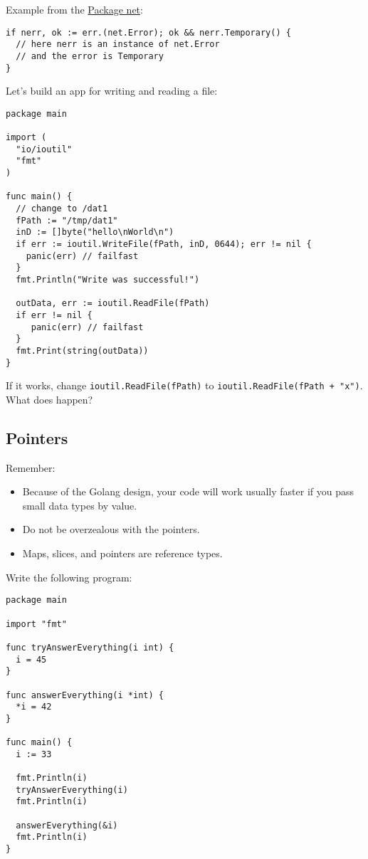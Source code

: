 \documentclass[11pt, letterpaper]{article}
\begin{document}
Example from the \href{https://golang.org/src/net/net.go}{Package net}:

\begin{verbatim}
if nerr, ok := err.(net.Error); ok && nerr.Temporary() {
  // here nerr is an instance of net.Error
  // and the error is Temporary
}
\end{verbatim}

Let's build an app for writing and reading a file:

\begin{verbatim}
package main

import (
  "io/ioutil"
  "fmt"
)

func main() {
  // change to /dat1
  fPath := "/tmp/dat1"
  inD := []byte("hello\nWorld\n")
  if err := ioutil.WriteFile(fPath, inD, 0644); err != nil {
    panic(err) // failfast
  }
  fmt.Println("Write was successful!")

  outData, err := ioutil.ReadFile(fPath)
  if err != nil {
     panic(err) // failfast
  }
  fmt.Print(string(outData))
}
\end{verbatim}

If it works, change \texttt{ioutil.ReadFile(fPath)} to \texttt{ioutil.ReadFile(fPath + "x")}. What does happen?

\subsection{Pointers}

Remember:

\begin{itemize}
\item Because of the Golang design, your code will work usually faster if you pass small data types by value.
\item Do not be overzealous with the pointers.
\item Maps, slices, and pointers are reference types.
\end{itemize}

Write the following program:

\begin{verbatim}
package main

import "fmt"

func tryAnswerEverything(i int) {
  i = 45
}

func answerEverything(i *int) {
  *i = 42
}

func main() {
  i := 33

  fmt.Println(i)
  tryAnswerEverything(i)
  fmt.Println(i)

  answerEverything(&i)
  fmt.Println(i)
}
\end{verbatim}
\end{document}
